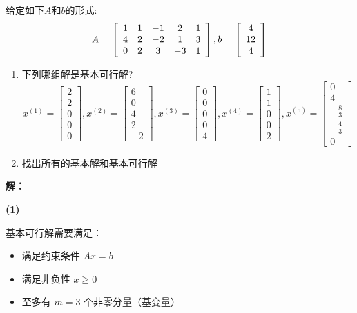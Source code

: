 \documentclass[12pt,a4paper]{article}
\begin{document}
给定如下$A$和$b$的形式:
\[ A= \left[\begin{array}{c c c c c}
1 & 1& -1 & 2 & 1 \\4 & 2 & -2 &1 & 3 \\ 0 & 2 & 3 &-3 &1
\end{array}\right], b= \left[\begin{array}{c }
4  \\12 \\ 4
\end{array}\right] \]
\begin{enumerate}
    \item 下列哪组解是基本可行解? 
\[ x^{(1)}= \left[\begin{array}{c } 2  \\2 \\ 0 \\0 \\0 \end{array}\right],
x^{(2)}=\left[\begin{array}{c } 6  \\0 \\ 4 \\2 \\-2 \end{array}\right] ,
x^{(3)}=\left[\begin{array}{c } 0  \\0 \\ 0 \\0 \\4 \end{array}\right] ,
x^{(4)}=   \left[\begin{array}{c } 1  \\1 \\ 0 \\0 \\2 \end{array}\right],
x^{(5)}=   \left[\begin{array}{c } 0  \\4 \\ -\frac{8}{3} \\-\frac{4}{3} \\0 \end{array}\right]  \]
\item 找出所有的基本解和基本可行解
\end{enumerate}

\textbf{解：}

\textbf{(1) }

基本可行解需要满足：
\begin{itemize}
    \item 满足约束条件 $Ax = b$
    \item 满足非负性 $x \geq 0$
    \item 至多有 $m=3$ 个非零分量（基变量）
\end{itemize}
\end{document}
